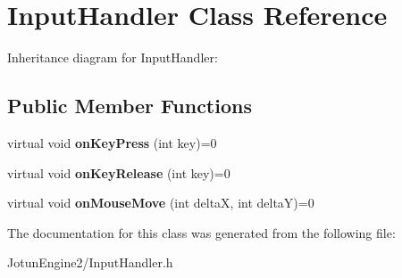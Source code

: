 \hypertarget{class_input_handler}{\section{Input\-Handler Class Reference}
\label{class_input_handler}
}


Inheritance diagram for Input\-Handler\-:
\subsection*{Public Member Functions}
\begin{DoxyCompactItemize}
\item 
\hypertarget{class_input_handler_a2d99c4441c45f09a50b52e2a7465e77e}{virtual void {\bfseries on\-Key\-Press} (int key)=0}\label{class_input_handler_a2d99c4441c45f09a50b52e2a7465e77e}

\item 
\hypertarget{class_input_handler_a8ca5e25c5fb77079704bc1ebc74ccf04}{virtual void {\bfseries on\-Key\-Release} (int key)=0}\label{class_input_handler_a8ca5e25c5fb77079704bc1ebc74ccf04}

\item 
\hypertarget{class_input_handler_afce8da8c018d9055fd99608b7c7e769c}{virtual void {\bfseries on\-Mouse\-Move} (int delta\-X, int delta\-Y)=0}\label{class_input_handler_afce8da8c018d9055fd99608b7c7e769c}

\end{DoxyCompactItemize}


The documentation for this class was generated from the following file\-:\begin{DoxyCompactItemize}
\item 
Jotun\-Engine2/Input\-Handler.\-h\end{DoxyCompactItemize}
